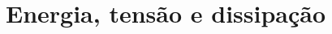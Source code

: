 \documentclass[Tese.tex]{subfiles}
\begin{document}

\section{Energia, tensão e dissipação}
\end{document}
